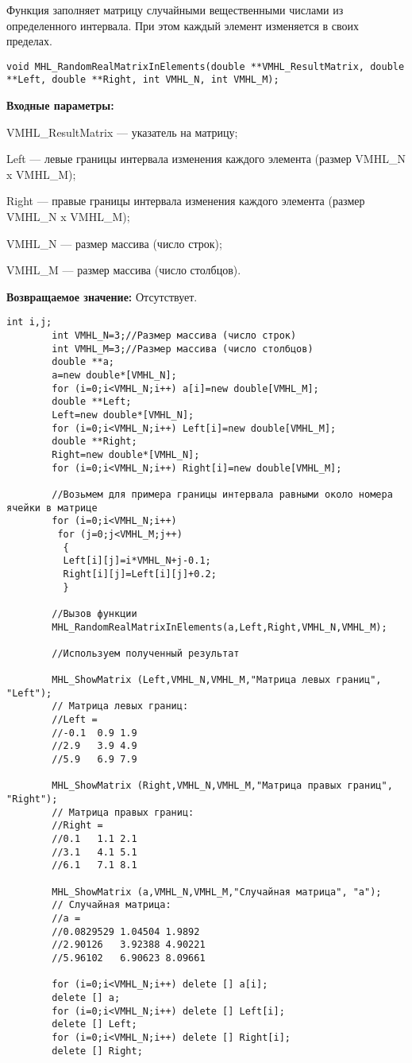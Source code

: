 \documentclass[a4paper,12pt]{article}
\begin{document}
Функция заполняет матрицу случайными вещественными числами из определенного интервала. При этом каждый элемент изменяется в своих пределах.


\begin{lstlisting}[label=code_syntax_MHL_RandomRealMatrixInElements,caption=Синтаксис]
void MHL_RandomRealMatrixInElements(double **VMHL_ResultMatrix, double **Left, double **Right, int VMHL_N, int VMHL_M);
\end{lstlisting}

\textbf{Входные параметры:}

 VMHL\_ResultMatrix --- указатель на матрицу;
 
Left --- левые границы интервала изменения каждого элемента (размер VMHL\_N x VMHL\_M);

 Right --- правые границы интервала изменения каждого элемента (размер VMHL\_N x VMHL\_M);
 
 VMHL\_N --- размер массива (число строк);
 
 VMHL\_M --- размер массива (число столбцов).

\textbf{Возвращаемое значение:}
Отсутствует.


\begin{lstlisting}[label=code_use_MHL_RandomRealMatrixInElements,caption=Пример использования]
        int i,j;
        int VMHL_N=3;//Размер массива (число строк)
        int VMHL_M=3;//Размер массива (число столбцов)
        double **a;
        a=new double*[VMHL_N];
        for (i=0;i<VMHL_N;i++) a[i]=new double[VMHL_M];
        double **Left;
        Left=new double*[VMHL_N];
        for (i=0;i<VMHL_N;i++) Left[i]=new double[VMHL_M];
        double **Right;
        Right=new double*[VMHL_N];
        for (i=0;i<VMHL_N;i++) Right[i]=new double[VMHL_M];

        //Возьмем для примера границы интервала равными около номера ячейки в матрице
        for (i=0;i<VMHL_N;i++)
         for (j=0;j<VMHL_M;j++)
          {
          Left[i][j]=i*VMHL_N+j-0.1;
          Right[i][j]=Left[i][j]+0.2;
          }

        //Вызов функции
        MHL_RandomRealMatrixInElements(a,Left,Right,VMHL_N,VMHL_M);

        //Используем полученный результат

        MHL_ShowMatrix (Left,VMHL_N,VMHL_M,"Матрица левых границ", "Left");
        // Матрица левых границ:
        //Left =
        //-0.1	0.9	1.9
        //2.9	3.9	4.9
        //5.9	6.9	7.9

        MHL_ShowMatrix (Right,VMHL_N,VMHL_M,"Матрица правых границ", "Right");
        // Матрица правых границ:
        //Right =
        //0.1	1.1	2.1
        //3.1	4.1	5.1
        //6.1	7.1	8.1

        MHL_ShowMatrix (a,VMHL_N,VMHL_M,"Случайная матрица", "a");
        // Случайная матрица:
        //a =
        //0.0829529	1.04504	1.9892
        //2.90126	3.92388	4.90221
        //5.96102	6.90623	8.09661

        for (i=0;i<VMHL_N;i++) delete [] a[i];
        delete [] a;
        for (i=0;i<VMHL_N;i++) delete [] Left[i];
        delete [] Left;
        for (i=0;i<VMHL_N;i++) delete [] Right[i];
        delete [] Right;
\end{lstlisting}
\end{document}
